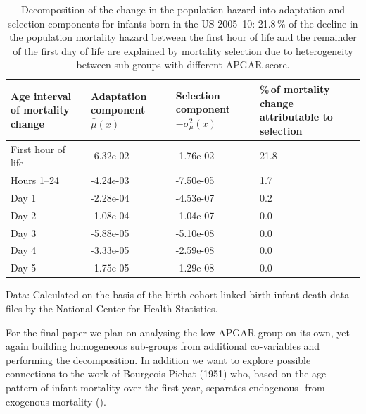 \documentclass[12pt, parskip=half]{scrartcl}
\begin{document}
\begin{table}[!htb]
  \tabformat
  \begin{threeparttable}
    \begin{tabular}{p{3cm}p{3cm}p{3cm}p{4cm}}
      \toprule
      Age interval of mortality change & Adaptation component $\bar{\dot{\mu}}(x)$ & Selection component $-\sigma^2_\mu(x)$ & \%\,of mortality change attributable to selection \\
      \midrule
      First hour of life & -6.32e-02 & -1.76e-02 & 21.8 \\
      Hours 1--24        & -4.24e-03 & -7.50e-05 &  1.7 \\
      Day 1              & -2.28e-04 & -4.53e-07 &  0.2 \\
      Day 2              & -1.08e-04 & -1.04e-07 &  0.0 \\
      Day 3              & -5.88e-05 & -5.10e-08 &  0.0 \\
      Day 4              & -3.33e-05 & -2.59e-08 &  0.0 \\
      Day 5              & -1.75e-05 & -1.29e-08 &  0.0 \\
      \bottomrule
    \end{tabular}
    \begin{tablenotes} \tabfontsizefoot
      \item Data: Calculated on the basis of the birth cohort linked birth-infant death data files by the National Center for Health Statistics.
    \end{tablenotes}
    \caption{Decomposition of the change in the population hazard into adaptation and selection components for infants born in the US 2005--10: 21.8\,\% of the decline in the population mortality hazard between the first hour of life and the remainder of the first day of life are explained by mortality selection due to heterogeneity between sub-groups with different APGAR score.}
    \label{tab:decomp}
  \end{threeparttable}
\end{table}

For the final paper we plan on analysing the low-APGAR group on its own, yet again building homogeneous sub-groups from additional co-variables and performing the decomposition. In addition we want to explore possible connections to the work of Bourgeois-Pichat (1951) who, based on the age-pattern of infant mortality over the first year, separates endogenous- from exogenous mortality (\cite{Bourgeois-pichat1951a}).

\clearpage


\sloppy
\printbibliography



\end{document}
